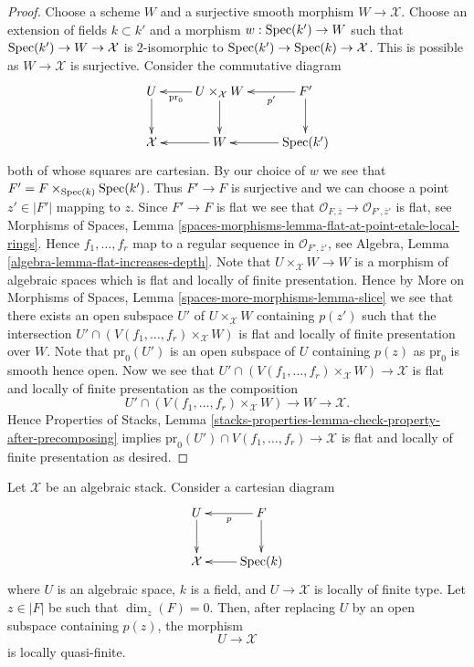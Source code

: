 \begin{proof}
Choose a scheme $W$ and a surjective smooth morphism $W \to \mathcal{X}$.
Choose an extension of fields $k \subset k'$ and a morphism
$w : \mathop{\rm Spec}(k') \to W$ such that $\mathop{\rm Spec}(k') \to W \to \mathcal{X}$
is $2$-isomorphic to $\mathop{\rm Spec}(k') \to \mathop{\rm Spec}(k) \to \mathcal{X}$.
This is possible as $W \to \mathcal{X}$ is surjective.
Consider the commutative diagram
$$
\xymatrix{
U \ar[d] &
U \times_\mathcal{X} W \ar[l]^-{\text{pr}_0} \ar[d] &
F' \ar[l]^-{p'} \ar[d] \\
\mathcal{X} &
W \ar[l] &
\Spec(k') \ar[l]
}
$$
both of whose squares are cartesian. By our choice of $w$ we see that
$F' = F \times_{\mathop{\rm Spec}(k)} \mathop{\rm Spec}(k')$. Thus $F' \to F$ is
surjective and we can choose a point $z' \in |F'|$ mapping to $z$.
Since $F' \to F$ is flat we see that
$\mathcal{O}_{F, \overline{z}} \to \mathcal{O}_{F', \overline{z}'}$ is
flat, see
Morphisms of Spaces,
Lemma \ref{spaces-morphisms-lemma-flat-at-point-etale-local-rings}.
Hence $f_1, \ldots, f_r$ map to a regular sequence in
$\mathcal{O}_{F', \overline{z}'}$, see
Algebra, Lemma \ref{algebra-lemma-flat-increases-depth}.
Note that $U \times_\mathcal{X} W \to W$ is a morphism of algebraic spaces
which is flat and locally of finite presentation. Hence by
More on Morphisms of Spaces, Lemma \ref{spaces-more-morphisms-lemma-slice}
we see that there exists an open subspace $U'$ of $U \times_\mathcal{X} W$
containing $p(z')$ such that the intersection
$U' \cap (V(f_1, \ldots, f_r) \times_\mathcal{X} W)$ is flat and locally
of finite presentation over $W$. Note that
$\text{pr}_0(U')$ is an open subspace of $U$ containing $p(z)$
as $\text{pr}_0$ is smooth hence open. Now we see that
$U' \cap (V(f_1, \ldots, f_r) \times_\mathcal{X} W) \to \mathcal{X}$
is flat and locally of finite presentation as the composition
$$
U' \cap (V(f_1, \ldots, f_r) \times_\mathcal{X} W) \to W \to \mathcal{X}.
$$
Hence
Properties of Stacks,
Lemma \ref{stacks-properties-lemma-check-property-after-precomposing}
implies $\text{pr}_0(U') \cap V(f_1, \ldots, f_r) \to \mathcal{X}$
is flat and locally of finite presentation as desired.
\end{proof}

\begin{lemma}
\label{lemma-quasi-finite-at-point}
Let $\mathcal{X}$ be an algebraic stack. Consider a cartesian diagram
$$
\xymatrix{
U \ar[d] & F \ar[l]^p \ar[d] \\
\mathcal{X} & \Spec(k) \ar[l]
}
$$
where $U$ is an algebraic space, $k$ is a field, and $U \to \mathcal{X}$
is locally of finite type. Let $z \in |F|$ be such that $\dim_z(F) = 0$.
Then, after replacing $U$ by an open subspace containing $p(z)$, the morphism
$$
U \longrightarrow \mathcal{X}
$$
is locally quasi-finite.
\end{lemma}

